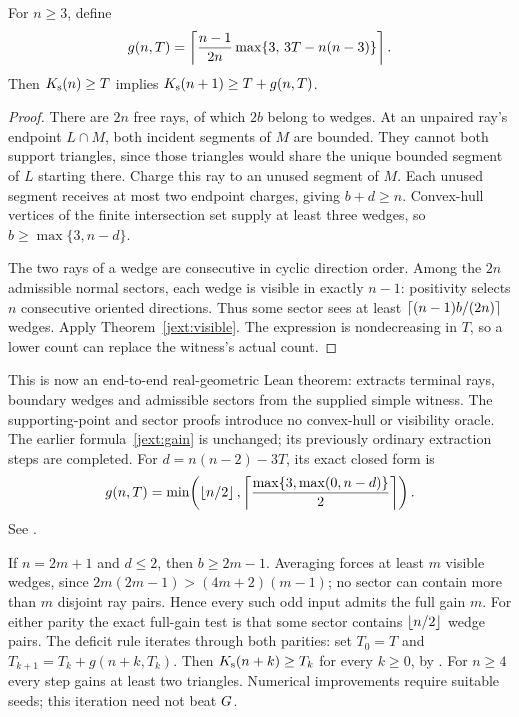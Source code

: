 \begin{theorem}
\label{jext:defect}
For $n\ge3$, define
\begin{equation}
 g(n,T)=\left\lceil\frac{n-1}{2n}\max\{3,\,3T-n(n-3)\}\right\rceil.
 \label{jext:gain}
\end{equation}
Then $K_{\mathrm s}(n)\ge T$ implies $K_{\mathrm s}(n+1)\ge T+g(n,T)$.
\end{theorem}
\begin{proof}
There are $2n$ free rays, of which $2b$ belong to wedges.  At an unpaired
ray's endpoint $L\cap M$, both incident segments of $M$ are bounded.
They cannot both support triangles, since those triangles would share
the unique bounded segment of $L$ starting there.  Charge this ray to
an unused segment of $M$.  Each unused segment receives at most two
endpoint charges, giving $b+d\ge n$.  Convex-hull vertices of the finite
intersection set supply at least three wedges, so $b\ge\max\{3,n-d\}$.

The two rays of a wedge are consecutive in cyclic direction order.
Among the $2n$ admissible normal sectors, each wedge is visible in
exactly $n-1$: positivity selects $n$ consecutive oriented directions.
Thus some sector sees at least $\left\lceil(n-1)b/(2n)\right\rceil$ wedges.  Apply
Theorem~\ref{jext:visible}.  The expression is nondecreasing in $T$,
so a lower count can replace the witness's actual count.
\end{proof}
This is now an end-to-end real-geometric Lean theorem:
extracts terminal rays, boundary wedges and admissible sectors from the
supplied simple witness. The supporting-point and sector proofs introduce
no convex-hull or visibility oracle. The earlier formula~\eqref{jext:gain}
is unchanged; its previously ordinary extraction steps are completed.
For $d=n(n-2)-3T$, its exact closed form is
\begin{equation}\label{jext:closed-gain}
 g(n,T)=\min\!\left(\left\lfloor n/2\right\rfloor,
 \left\lceil\frac{\max\{3,\max(0,n-d)\}}2\right\rceil\right).
\end{equation}
See .

If $n=2m+1$ and $d\le2$, then $b\ge2m-1$.  Averaging forces at least
$m$ visible wedges, since
$2m(2m-1)>(4m+2)(m-1)$; no sector can contain more than $m$ disjoint
ray pairs. Hence every such odd input admits the full gain $m$.
For either parity the exact full-gain test is that some sector contains
$\left\lfloor n/2\right\rfloor$ wedge pairs. The deficit rule iterates through both parities:
set $T_0=T$ and $T_{k+1}=T_k+g(n+k,T_k)$. Then $K_{\mathrm s}(n+k)\ge T_k$
for every $k\ge0$, by
.
For $n\ge4$ every step gains at least two triangles. Numerical improvements
require suitable seeds; this iteration need not beat $G$.

